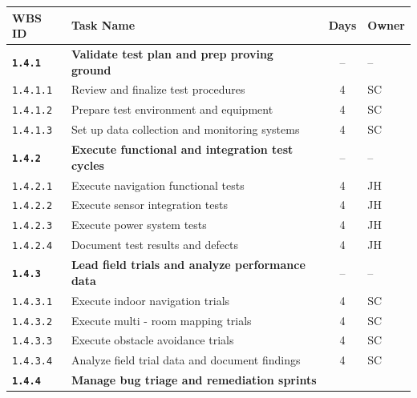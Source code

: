 \newpage
\begin{table}[H]
\centering
\small
\begin{tabular} {
  | l | p{6.5cm} | c | l |
}
\hline
\rowcolor { testgreen !40 }
\textbf{WBS ID} & \textbf{Task Name} & \textbf{Days} & \textbf { Owner }
\\
\hline
\rowcolor { testgreen !35 }
\texttt{\textbf{1.4.1}} & \textbf{Validate test plan and prep proving ground} &
    --&-- \\
\hline
\rowcolor {
  white
}
\texttt{1.4.1.1} & \quad Review and finalize test procedures & 4 & SC \\
\hline
\rowcolor {
  testgreen !15
}
\texttt{1.4.1.2} & \quad Prepare test environment and equipment & 4 & SC \\
\hline
\rowcolor {
  white
}
\texttt{1.4.1.3} & \quad Set up data collection and monitoring systems & 4 & SC \\
\hline
\rowcolor {
  testgreen !35
}
\texttt{\textbf{1.4.2}} & \textbf{Execute functional and
                                  integration test cycles} &
    --&-- \\
\hline
\rowcolor {
  testgreen !15
}
\texttt{1.4.2.1} & \quad Execute navigation functional tests & 4 & JH \\
\hline
\rowcolor {
  white
}
\texttt{1.4.2.2} & \quad Execute sensor integration tests & 4 & JH \\
\hline
\rowcolor {
  testgreen !15
}
\texttt{1.4.2.3} & \quad Execute power system tests & 4 & JH \\
\hline
\rowcolor {
  white
}
\texttt{1.4.2.4} & \quad Document test results and defects & 4 & JH \\
\hline
\rowcolor {
  testgreen !35
}
\texttt{\textbf{1.4.3}} & \textbf{Lead field trials and
                                  analyze performance data} &
    --&-- \\
\hline
\rowcolor {
  testgreen !15
}
\texttt{1.4.3.1} & \quad Execute indoor navigation trials & 4 & SC \\
\hline
\rowcolor {
  white
}
\texttt{1.4.3.2} & \quad Execute multi - room mapping trials & 4 & SC \\
\hline
\rowcolor {
  testgreen !15
}
\texttt{1.4.3.3} & \quad Execute obstacle avoidance trials & 4 & SC \\
\hline
\rowcolor {
  white
}
\texttt{1.4.3.4} & \quad Analyze field trial data and document findings & 4 & SC \\
\hline
\rowcolor {
  testgreen !35
}
\texttt{\textbf{1.4.4}} & \textbf{Manage bug triage and remediation sprints} &

\end{tabular}
\end{table}
